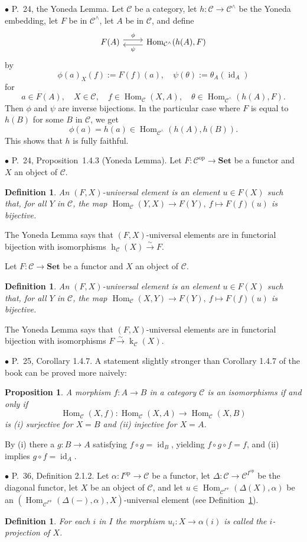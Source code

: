 \documentclass[12pt]{article}
\newtheorem{prop}[thm]{Proposition}
\newtheorem{df}[thm]{Definition}%
\theoremstyle{remark}%
\newcommand{\bu}{\bullet}
\newcommand{\n}{\noindent}
\newcommand{\C}{\mathcal C}
\newcommand{\Set}{\textbf{Set}}
\newcommand{\xr}{\xrightarrow}
\newcommand{\bp}{\begin{prop}}
\newcommand{\ep}{\end{prop}}
\newcommand{\pr}{Proposition}
\DeclareMathOperator{\hy}{h}
\DeclareMathOperator{\ky}{k}
\DeclareMathOperator{\id}{id}
\DeclareMathOperator{\Hom}{Hom}
\DeclareMathOperator{\h}{Hom}
\DeclareMathOperator{\op}{op}
\begin{document}

\n$\bu$ P.~24, the Yoneda Lemma. Let $\C$ be a category, let $h:\C\to\C^\wedge$ be the Yoneda embedding, let $F$ be in $\C^\wedge$, let $A$ be in $\C$, and define 
$$
\begin{tikzcd} 
F(A)\ar[yshift=0.7ex]{r}{\phi}&\Hom_{\C^\wedge}(h(A),F)\ar[yshift=-0.7ex]{l}{\psi}
\end{tikzcd}
$$
by 
$$
\phi(a)_X(f):=F(f)(a),\quad\psi(\theta):=\theta_A(\id_A)
$$
for 
$$
a\in F(A),\quad X\in\C,\quad f\in\Hom_\C(X,A),\quad\theta\in\Hom_{\C^\wedge}(h(A),F).
$$ 
Then $\phi$ and $\psi$ are inverse bijections. In the particular case where $F$ is equal to $h(B)$ for some $B$ in $\C$, we get 
$$
\phi(a)=h(a)\in\Hom_{\C^\wedge}(h(A),h(B)).
$$
This shows that $h$ is fully faithful. 


\n$\bu$ P.~24, \pr\ 1.4.3 (Yoneda Lemma). Let $F:\C^{\op}\to\Set$ be a functor and $X$ an object of $\C$.  
%
\begin{df}\label{ue} 
An $(F,X)$-{\em universal element} is an element $u\in F(X)$ such that, for all $Y$ in $\C$, the map $\h_\C(Y,X)\to F(Y),\ f\mapsto F(f)(u)$ is bijective. 
\end{df}

The Yoneda Lemma says that $(F,X)$-universal elements are in functorial bijection with isomorphisms $\hy_\C(X)\xr\sim F$. 

Let $F:\C\to\Set$ be a functor and $X$ an object of $\C$.  
%
\begin{df}\label{ue2} 
An $(F,X)$-{\em universal element} is an element $u\in F(X)$ such that, for all $Y$ in $\C$, the map $\Hom_\C(X,Y)\to F(Y),\ f\mapsto F(f)(u)$ is bijective. 
\end{df}

The Yoneda Lemma says that $(F,X)$-universal elements are in functorial bijection with isomorphisms $F\xr\sim\ky_\C(X)$. 


\n$\bu$ P.~25, Corollary 1.4.7. A statement slightly stronger than Corollary 1.4.7 of the book can be proved more naively:
% 
\bp
A morphism $f:A\to B$ in a category $\C$ is an isomorphisms if and only if 
$$
\Hom_\C(X,f):\Hom_\C(X,A)\to\Hom_\C(X,B)
$$
is (i) surjective for $X=B$ and (ii) injective for $X=A$.
\ep
%
\n{\em Proof.} By (i) there a $g:B\to A$ satisfying $f\circ g=\id_B$, yielding $f\circ g\circ f=f$, and (ii) implies $g\circ f=\id_A$. 


\n$\bu$ P.~36, Definition 2.1.2. Let $\alpha:I^{\op}\to\C$ be a functor, let $\Delta:\C\to\C^{I^{\op}}$ be the diagonal functor, let $X$ be an object of $\C$, and let $u\in\h_{\C^{I^{\op}}}(\Delta(X),\alpha)$ be an $(\h_{\C^{I^{\op}}}(\Delta(-),\alpha),X)$-universal element (see Definition~\ref{ue}). 
%
\begin{df}\label{p}
For each $i$ in $I$ the morphism $u_i:X\to\alpha(i)$ is called the $i$-{\em projection} of $X$.
\end{df}
\end{document}
